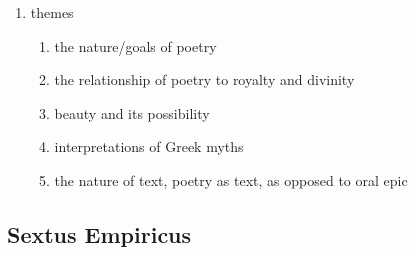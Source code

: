 \documentclass[12pt]{article}
\begin{document}
\begin{enumerate}
\begin{enumerate}
    \item has a relatively set structure: invocation, prayer, praise
    \item Callimachus consciously imitates this form, two types
        \begin{enumerate}
        \item mimetic (``Hymn to Apollo''): a recreation of the hymn setting/action
        \item non-mimetic (``Hymn to Artemis): narration of the hymn form
        \end{enumerate}
    \item would have been sung or danced to
    \item seem consciously arranged, if not by Callimachus himself
    \item written in an affected Homeric idiom (as was common), despite having a different native dialect (Doric) and the Greek language having changed (Koine)
    \item also develops his own unique vocabulary, frequently uses puns and sonic/visual tricks
    \item poems are highly structured and concise; uses a much more rigid metrical style than Homer and other older poets, usually dactylic hexameter
    \end{enumerate}
\item themes
    \begin{enumerate}
    \item the nature/goals of poetry
    \item the relationship of poetry to royalty and divinity
    \item beauty and its possibility
    \item interpretations of Greek myths
    \item the nature of text, poetry as text, as opposed to oral epic
    \end{enumerate}
\end{enumerate}

\subsection{Sextus Empiricus}
\end{document}
